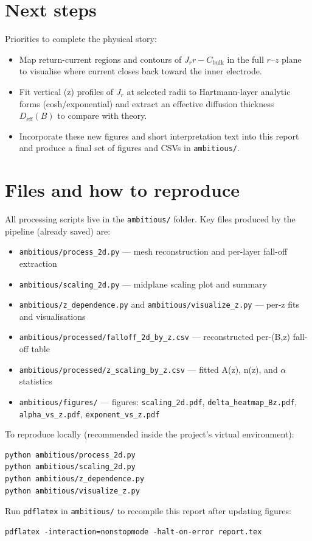 \documentclass[11pt, a4paper]{article}
\begin{document}
\section{Next steps}
Priorities to complete the physical story:
\begin{itemize}
  \item Map return-current regions and contours of $J_r r - C_{\mathrm{bulk}}$ in
      the full $r$--$z$ plane to visualise where current closes back toward the
      inner electrode.
  \item Fit vertical (z) profiles of $J_r$ at selected radii to Hartmann-layer
      analytic forms (cosh/exponential) and extract an effective diffusion
      thickness $D_{\mathrm{eff}}(B)$ to compare with theory.
  \item Incorporate these new figures and short interpretation text into this
      report and produce a final set of figures and CSVs in \texttt{ambitious/}.
\end{itemize}

\section{Files and how to reproduce}
All processing scripts live in the \texttt{ambitious/} folder. Key files produced by
the pipeline (already saved) are:
\begin{itemize}
    \item \texttt{ambitious/process\_2d.py} — mesh reconstruction and per-layer fall-off extraction
    \item \texttt{ambitious/scaling\_2d.py} — midplane scaling plot and summary
    \item \texttt{ambitious/z\_dependence.py} and \texttt{ambitious/visualize\_z.py} — per-z fits and visualisations
    \item \texttt{ambitious/processed/falloff\_2d\_by\_z.csv} — reconstructed per-(B,z) fall-off table
    \item \texttt{ambitious/processed/z\_scaling\_by\_z.csv} — fitted A(z), n(z), and $\alpha$ statistics
    \item \texttt{ambitious/figures/} — figures: \texttt{scaling\_2d.pdf}, \texttt{delta\_heatmap\_Bz.pdf},
                \texttt{alpha\_vs\_z.pdf}, \texttt{exponent\_vs\_z.pdf}
\end{itemize}

To reproduce locally (recommended inside the project's virtual environment):
\begin{verbatim}
python ambitious/process_2d.py
python ambitious/scaling_2d.py
python ambitious/z_dependence.py
python ambitious/visualize_z.py
\end{verbatim}

Run \texttt{pdflatex} in \texttt{ambitious/} to recompile this report after
updating figures:
\begin{verbatim}
pdflatex -interaction=nonstopmode -halt-on-error report.tex
\end{verbatim}
\end{document}

